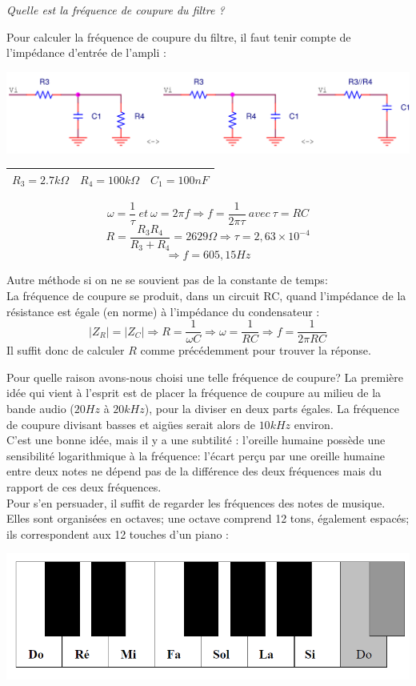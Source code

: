 {
\textit{Quelle est la fréquence de coupure du filtre ?}
}
{%
Pour calculer la fréquence de coupure du filtre, il faut tenir compte de l'impédance
d'entrée de l'ampli :
\begin{center}
\includegraphics[scale=0.35]{filtre.PNG}
\label{fonctionsblocs}
\begin{tabular}{|c||c||c|}\hline
$R_3 = 2.7 k\Omega$ & $R_4 = 100 k\Omega$ & $C_1 = 100 nF$ \\ \hline
\end{tabular}
\end{center}
$$\omega = \frac{1}{\tau}\ et\ \omega=2\pi f \Rightarrow f=\frac{1}{2\pi \tau}\ avec\ \tau = RC$$
$$R=\frac{R_3 R_4}{R_3 + R_4}=2629\Omega \Rightarrow \tau = 2,63 \times 10^{-4}$$
$$\Rightarrow f = 605,15Hz$$

Autre méthode si on ne se souvient pas de la constante de temps:\\
La fréquence de coupure se produit, dans un circuit RC, quand l'impédance de la
résistance est égale (en norme) à l'impédance du condensateur :
$$|Z_R|=|Z_C|\Rightarrow R=\frac{1}{\omega C} \Rightarrow \omega =\frac{1}{RC} \Rightarrow f=\frac{1}{2\pi RC}$$
Il suffit donc de calculer $R$ comme précédemment pour trouver la réponse.
}

Pour quelle raison avons-nous choisi une telle fréquence de coupure? La première idée qui vient à l'esprit est de placer la fréquence de coupure au milieu de la bande audio ($20Hz$ à $20kHz$), pour la diviser en deux parts égales. La fréquence de coupure divisant basses et aigües serait alors de $10kHz$ environ.\\
C'est une bonne idée, mais il y a une subtilité : l'oreille humaine possède une sensibilité logarithmique à la fréquence: l'écart perçu par une oreille humaine entre deux notes ne dépend pas de la différence des deux fréquences mais du rapport de ces deux fréquences.\\
Pour s'en persuader, il suffit de regarder les fréquences des notes de musique. Elles sont organisées en octaves; une octave comprend 12 tons, également espacés; ils correspondent aux 12 touches d'un piano :
\begin{center}
\includegraphics[scale=0.4]{piano.PNG}
\label{piano}
\end{center}

